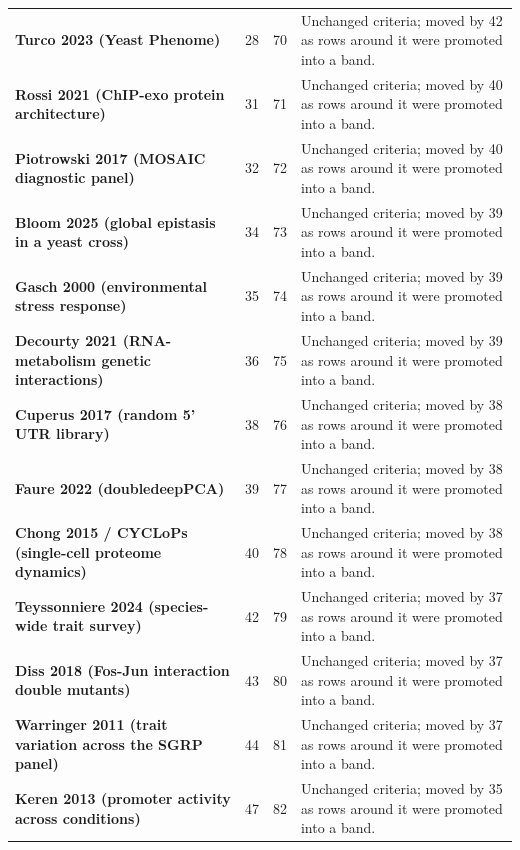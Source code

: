 \begin{longtable}{@{}L{46mm} r@{\hspace{6pt}} r@{\hspace{6pt}} L{104mm}@{}}
\addlinespace[5pt]
\textbf{Turco 2023 (Yeast Phenome)} & 28 & 70 & Unchanged criteria; moved by 42 as rows around it were promoted into a band. \\
\addlinespace[5pt]
\textbf{Rossi 2021 (ChIP-exo protein architecture)} & 31 & 71 & Unchanged criteria; moved by 40 as rows around it were promoted into a band. \\
\addlinespace[5pt]
\textbf{Piotrowski 2017 (MOSAIC diagnostic panel)} & 32 & 72 & Unchanged criteria; moved by 40 as rows around it were promoted into a band. \\
\addlinespace[5pt]
\textbf{Bloom 2025 (global epistasis in a yeast cross)} & 34 & 73 & Unchanged criteria; moved by 39 as rows around it were promoted into a band. \\
\addlinespace[5pt]
\textbf{Gasch 2000 (environmental stress response)} & 35 & 74 & Unchanged criteria; moved by 39 as rows around it were promoted into a band. \\
\addlinespace[5pt]
\textbf{Decourty 2021 (RNA-metabolism genetic interactions)} & 36 & 75 & Unchanged criteria; moved by 39 as rows around it were promoted into a band. \\
\addlinespace[5pt]
\textbf{Cuperus 2017 (random 5' UTR library)} & 38 & 76 & Unchanged criteria; moved by 38 as rows around it were promoted into a band. \\
\addlinespace[5pt]
\textbf{Faure 2022 (doubledeepPCA)} & 39 & 77 & Unchanged criteria; moved by 38 as rows around it were promoted into a band. \\
\addlinespace[5pt]
\textbf{Chong 2015 / CYCLoPs (single-cell proteome dynamics)} & 40 & 78 & Unchanged criteria; moved by 38 as rows around it were promoted into a band. \\
\addlinespace[5pt]
\textbf{Teyssonniere 2024 (species-wide trait survey)} & 42 & 79 & Unchanged criteria; moved by 37 as rows around it were promoted into a band. \\
\addlinespace[5pt]
\textbf{Diss 2018 (Fos-Jun interaction double mutants)} & 43 & 80 & Unchanged criteria; moved by 37 as rows around it were promoted into a band. \\
\addlinespace[5pt]
\textbf{Warringer 2011 (trait variation across the SGRP panel)} & 44 & 81 & Unchanged criteria; moved by 37 as rows around it were promoted into a band. \\
\addlinespace[5pt]
\textbf{Keren 2013 (promoter activity across conditions)} & 47 & 82 & Unchanged criteria; moved by 35 as rows around it were promoted into a band. \\

\end{longtable}
